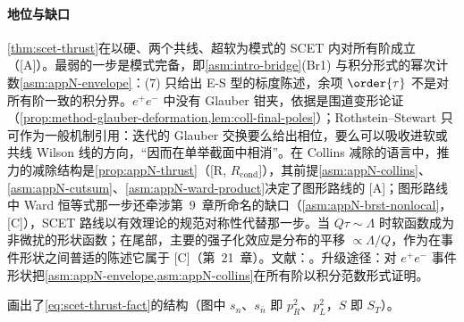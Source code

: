 \paragraph{地位与缺口}
\cref{thm:scet-thrust}在以硬、两个共线、超软为模式的 SCET 内对所有阶成立（[A]）。最弱的一步是模式完备，即\cref{asm:intro-bridge}(Br1) 与积分形式的幂次计数\cref{asm:appN-envelope}：(7) 只给出 E-S 型的标度陈述，余项 $\order{\tau}$ 不是对所有阶一致的积分界。$e^+e^-$ 中没有 Glauber 钳夹，依据是围道变形论证（\cref{prop:method-glauber-deformation,lem:coll-final-poles}）；Rothstein--Stewart 只可作为一般机制引用：迭代的 Glauber 交换要么给出相位，要么可以吸收进软或共线 Wilson 线的方向，“因而在单举截面中相消”\cite{RothsteinStewart2016}。在 Collins 减除的语言中，推力的减除结构是\cref{prop:appN-thrust}（[R, $R_{\mathrm{cond}}$]），其前提\cref{asm:appN-collins}、\cref{asm:appN-cutsum}、\cref{asm:appN-ward-product}决定了图形路线的 [A]；图形路线中 Ward 恒等式那一步还牵涉第~9~章所命名的缺口（\cref{asm:appN-brst-nonlocal}，[C]），SCET 路线以有效理论的规范对称性代替那一步。当 $Q\tau\sim\Lambda$ 时软函数成为非微扰的形状函数\cite{Korchemsky:1994is,Korchemsky:1999kt,Bauer:2003di}；在尾部，主要的强子化效应是分布的平移 $\propto\Lambda/Q$，作为在事件形状之间普适的陈述它属于 [C]（第~21~章）。文献：\cite{Bauer:2003di,Lee:2006nr,Fleming:2007qr,Schwartz:2007ib,Fleming:2007xt,BecherSchwartz2008,Bauer:2008dt}。升级途径：对 $e^+e^-$ 事件形状把\cref{asm:appN-envelope,asm:appN-collins}在所有阶以积分范数形式证明。

画出了\cref{eq:scet-thrust-fact}的结构（图中 $s_n$、$s_{\bar n}$ 即 $p_R^2$、$p_L^2$，$S$ 即 $S_T$）。

